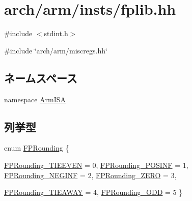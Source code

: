 \hypertarget{fplib_8hh}{
\section{arch/arm/insts/fplib.hh}
\label{fplib_8hh}
}
{\ttfamily \#include $<$stdint.h$>$}\par
{\ttfamily \#include \char`\"{}arch/arm/miscregs.hh\char`\"{}}\par
\subsection*{ネームスペース}
\begin{DoxyCompactItemize}
\item 
namespace \hyperlink{namespaceArmISA}{ArmISA}
\end{DoxyCompactItemize}
\subsection*{列挙型}
\begin{DoxyCompactItemize}
\item 
enum \hyperlink{namespaceArmISA_a1d30750bfd1f4a9f3f05ee7b04c4cf23}{FPRounding} \{ \par
\hyperlink{namespaceArmISA_a1d30750bfd1f4a9f3f05ee7b04c4cf23a689bcabf5ded815e4d9fc68cdac6a5ae}{FPRounding\_\-TIEEVEN} =  0, 
\hyperlink{namespaceArmISA_a1d30750bfd1f4a9f3f05ee7b04c4cf23a95f550bf7258c7187786df4e71b6dde8}{FPRounding\_\-POSINF} =  1, 
\hyperlink{namespaceArmISA_a1d30750bfd1f4a9f3f05ee7b04c4cf23a90625b90d9549783d34ea896cb1edb82}{FPRounding\_\-NEGINF} =  2, 
\hyperlink{namespaceArmISA_a1d30750bfd1f4a9f3f05ee7b04c4cf23abe9986d8b46e7e94b35fd34c63c5fdae}{FPRounding\_\-ZERO} =  3, 
\par
\hyperlink{namespaceArmISA_a1d30750bfd1f4a9f3f05ee7b04c4cf23a60da886b9a77b5bf61278046265f7b4c}{FPRounding\_\-TIEAWAY} =  4, 
\hyperlink{namespaceArmISA_a1d30750bfd1f4a9f3f05ee7b04c4cf23ab0a26e378304d5f480f92c188616392d}{FPRounding\_\-ODD} =  5
 \}
\end{DoxyCompactItemize}
